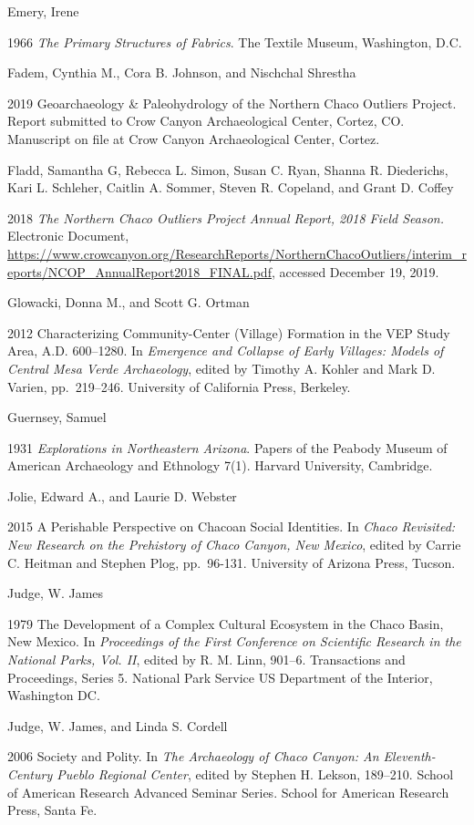 \documentclass[
  12pt,
]{krantz}
\begin{document}
Emery, Irene

1966 \emph{The Primary Structures of Fabrics}. The Textile Museum,
Washington, D.C.

Fadem, Cynthia M., Cora B. Johnson, and Nischchal Shrestha

2019 Geoarchaeology \& Paleohydrology of the Northern Chaco Outliers
Project. Report submitted to Crow Canyon Archaeological Center, Cortez,
CO. Manuscript on file at Crow Canyon Archaeological Center, Cortez.

Fladd, Samantha G, Rebecca L. Simon, Susan C. Ryan, Shanna R.
Diederichs, Kari L. Schleher, Caitlin A. Sommer, Steven R. Copeland, and
Grant D. Coffey

2018 \emph{The Northern Chaco Outliers Project Annual Report, 2018 Field
Season.} Electronic Document,
\url{https://www.crowcanyon.org/ResearchReports/NorthernChacoOutliers/interim_reports/NCOP_AnnualReport2018_FINAL.pdf},
accessed December 19, 2019.

Glowacki, Donna M., and Scott G. Ortman

2012 Characterizing Community-Center (Village) Formation in the VEP
Study Area, A.D. 600--1280. In \emph{Emergence and Collapse of Early
Villages: Models of Central Mesa Verde Archaeology}, edited by Timothy
A. Kohler and Mark D. Varien, pp.~219--246. University of California
Press, Berkeley.

Guernsey, Samuel

1931 \emph{Explorations in Northeastern Arizona}. Papers of the Peabody
Museum of American Archaeology and Ethnology 7(1). Harvard University,
Cambridge.

Jolie, Edward A., and Laurie D. Webster

2015 A Perishable Perspective on Chacoan Social Identities. In \emph{Chaco
Revisited: New Research on the Prehistory of Chaco Canyon, New Mexico},
edited by Carrie C. Heitman and Stephen Plog, pp.~96-131. University of
Arizona Press, Tucson.

Judge, W. James

1979 The Development of a Complex Cultural Ecosystem in the Chaco Basin,
New Mexico. In \emph{Proceedings of the First Conference on Scientific
Research in the National Parks, Vol. II}, edited by R. M. Linn, 901--6.
Transactions and Proceedings, Series 5. National Park Service US
Department of the Interior, Washington DC.

Judge, W. James, and Linda S. Cordell

2006 Society and Polity. In \emph{The Archaeology of Chaco Canyon: An
Eleventh-Century Pueblo Regional Center}, edited by Stephen H. Lekson,
189--210. School of American Research Advanced Seminar Series. School
for American Research Press, Santa Fe.
\end{document}

